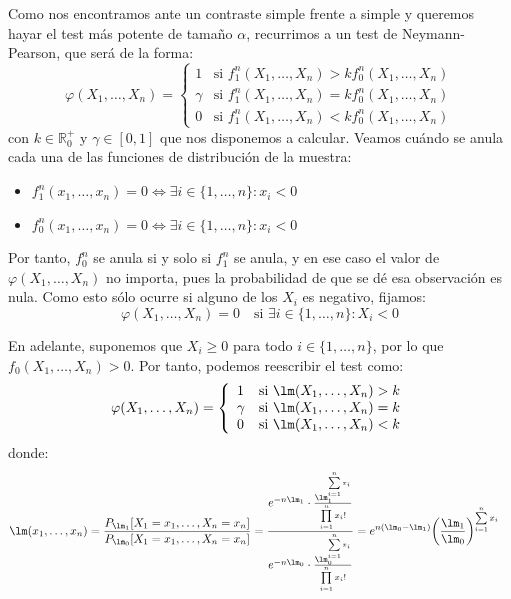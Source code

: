 \begin{ejercicio}
    Como nos encontramos ante un contraste simple frente a simple y queremos hayar el test más potente de tamaño $\alpha$, recurrimos a un test de Neymann-Pearson, que será de la forma:
    \begin{equation*}
        \varphi(X_1, \ldots, X_n) = \left\{\begin{array}{ll}
            1 & \text{si\ } f_1^n(X_1, \ldots, X_n) > k f_0^n(X_1, \ldots, X_n) \\
             \gamma & \text{si\ } f_1^n(X_1, \ldots, X_n) = k f_0^n(X_1, \ldots, X_n) \\
             0 & \text{si\ } f_1^n(X_1, \ldots, X_n) < k f_0^n(X_1, \ldots, X_n)
        \end{array}\right.
    \end{equation*}
    con $k\in \mathbb{R}^+_0$ y $\gamma\in [0,1]$ que nos disponemos a calcular. Veamos cuándo se anula cada una de las funciones de distribución de la muestra:
    \begin{itemize}
        \item $f_1^n(x_1, \ldots, x_n) = 0 \Longleftrightarrow \exists i\in \{1, \ldots, n\} : x_i < 0$
        \item $f_0^n(x_1, \ldots, x_n) = 0 \Longleftrightarrow \exists i\in \{1, \ldots, n\} : x_i < 0$
    \end{itemize}

    Por tanto, $f_0^n$ se anula si y solo si $f_1^n$ se anula, y en ese caso el valor de $\varphi(X_1, \ldots, X_n)$ no importa, pues la probabilidad de que se dé esa observación es nula. Como esto sólo ocurre si alguno de los $X_i$ es negativo, fijamos:
    \begin{equation*}
        \varphi(X_1, \ldots, X_n) = 0 \quad\text{si\ } \exists i\in \{1, \ldots, n\} : X_i < 0
    \end{equation*}

    En adelante, suponemos que $X_i \geq 0$ para todo $i\in \{1, \ldots, n\}$, por lo que $f_0(X_1, \ldots, X_n) > 0$. Por tanto, podemos reescribir el test como:
    \begin{equation*}
        \varphi(X_1, \ldots, X_n) = \left\{\begin{array}{ll}
            1 & \text{si\ } \lm(X_1, \ldots, X_n) > k \\
             \gamma & \text{si\ } \lm(X_1, \ldots, X_n) = k \\
             0 & \text{si\ } \lm(X_1, \ldots, X_n) < k
        \end{array}\right. 
    \end{equation*}
    donde:
    \begin{align*}
        \lm(x_1,\ldots, x_n) &= \frac{P_{\lm_1}[X_1=x_1,\ldots, X_n=x_n]}{P_{\lm_0}[X_1=x_1,\ldots, X_n=x_n]} = \frac{e^{-n\lm_1} \cdot \frac{\lm_1^{\sum\limits_{i=1}^{n}x_i}}{\prod\limits_{i=1}^{n}x_i!} }{e^{-n\lm_0} \cdot \frac{\lm_0^{\sum\limits_{i=1}^{n}x_i}}{\prod\limits_{i=1}^{n}x_i!} } = e^{n(\lm_0-\lm_1)} {\left(\frac{\lm_1}{\lm_0}\right)}^{\sum\limits_{i=1}^{n}x_i}
    \end{align*}


\end{ejercicio}
